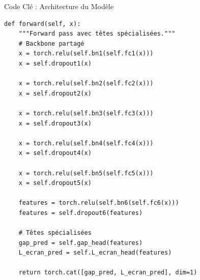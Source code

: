 \documentclass[aspectratio=169]{beamer}
\begin{document}
\begin{frame}[fragile]{Code Clé : Architecture du Modèle}
    \begin{lstlisting}[caption=Forward pass avec têtes spécialisées]
def forward(self, x):
    """Forward pass avec têtes spécialisées."""
    # Backbone partagé
    x = torch.relu(self.bn1(self.fc1(x)))
    x = self.dropout1(x)

    x = torch.relu(self.bn2(self.fc2(x)))
    x = self.dropout2(x)

    x = torch.relu(self.bn3(self.fc3(x)))
    x = self.dropout3(x)

    x = torch.relu(self.bn4(self.fc4(x)))
    x = self.dropout4(x)

    x = torch.relu(self.bn5(self.fc5(x)))
    x = self.dropout5(x)

    features = torch.relu(self.bn6(self.fc6(x)))
    features = self.dropout6(features)

    # Têtes spécialisées
    gap_pred = self.gap_head(features)
    L_ecran_pred = self.L_ecran_head(features)

    return torch.cat([gap_pred, L_ecran_pred], dim=1)
    \end{lstlisting}
\end{frame}
\end{document}
